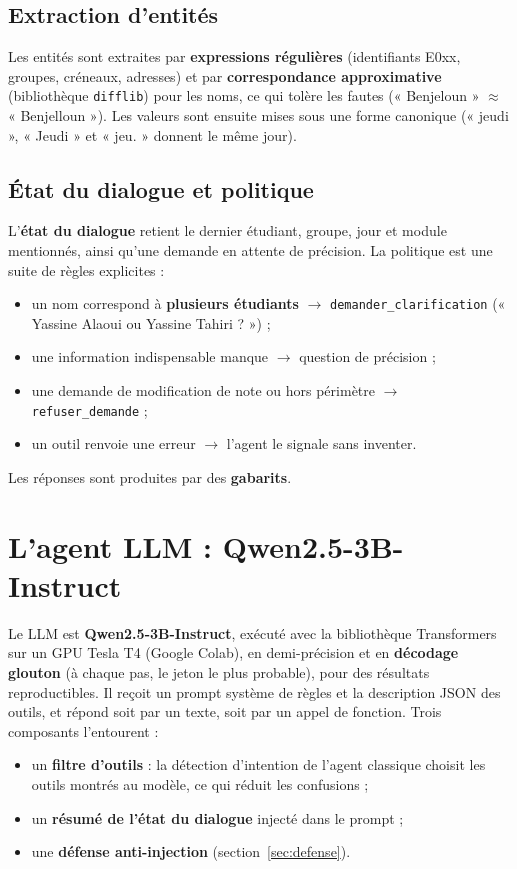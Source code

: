 \documentclass[11pt,a4paper]{report}
\begin{document}
\subsection{Extraction d'entités}
Les entités sont extraites par \textbf{expressions régulières} (identifiants E0xx, groupes, créneaux, adresses) et
par \textbf{correspondance approximative} (bibliothèque \texttt{difflib}) pour les noms, ce qui tolère les fautes
(« Benjeloun » $\approx$ « Benjelloun »). Les valeurs sont ensuite mises sous une forme canonique (« jeudi »,
« Jeudi » et « jeu. » donnent le même jour).

\subsection{État du dialogue et politique}
L'\textbf{état du dialogue} retient le dernier étudiant, groupe, jour et module mentionnés, ainsi qu'une demande en
attente de précision. La politique est une suite de règles explicites :
\begin{itemize}
  \item un nom correspond à \textbf{plusieurs étudiants} $\rightarrow$ \texttt{demander\_clarification}
        (« Yassine Alaoui ou Yassine Tahiri ? ») ;
  \item une information indispensable manque $\rightarrow$ question de précision ;
  \item une demande de modification de note ou hors périmètre $\rightarrow$ \texttt{refuser\_demande} ;
  \item un outil renvoie une erreur $\rightarrow$ l'agent le signale sans inventer.
\end{itemize}
Les réponses sont produites par des \textbf{gabarits}.

\section{L'agent LLM : Qwen2.5-3B-Instruct}
Le LLM est \textbf{Qwen2.5-3B-Instruct}, exécuté avec la bibliothèque Transformers sur un GPU Tesla T4 (Google
Colab), en demi-précision et en \textbf{décodage glouton} (à chaque pas, le jeton le plus probable), pour des
résultats reproductibles. Il reçoit un prompt système de règles et la description JSON des outils, et répond soit
par un texte, soit par un appel de fonction. Trois composants l'entourent :
\begin{itemize}
  \item un \textbf{filtre d'outils} : la détection d'intention de l'agent classique choisit les outils montrés au
        modèle, ce qui réduit les confusions ;
  \item un \textbf{résumé de l'état du dialogue} injecté dans le prompt ;
  \item une \textbf{défense anti-injection} (section~\ref{sec:defense}).
\end{itemize}
\end{document}
